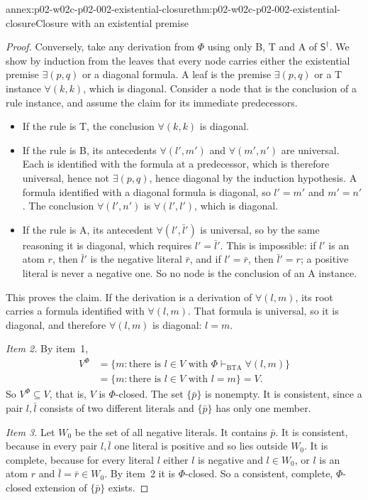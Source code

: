 \begin{annexitem}{annex:p02-w02c-p02-002-existential-closure}{thm:p02-w02c-p02-002-existential-closure}{Closure with an existential premise}
\begin{proof}
Conversely, take any derivation from \(\Phi\) using only B, T and A of
\(\mathsf S^\dagger\). We show by induction from the leaves that every node
carries either the existential premise \(\exists(p,q)\) or a diagonal
formula. A leaf is the premise \(\exists(p,q)\) or a T instance
\(\forall(k,k)\), which is diagonal. Consider a node that is the conclusion
of a rule instance, and assume the claim for its immediate predecessors.
\begin{itemize}
\item If the rule is T, the conclusion \(\forall(k,k)\) is diagonal.
\item If the rule is B, its antecedents \(\forall(l',m')\) and
 \(\forall(m',n')\) are universal. Each is identified with the formula at a
 predecessor, which is therefore universal, hence not \(\exists(p,q)\), hence
 diagonal by the induction hypothesis. A formula identified with a diagonal
 formula is diagonal, so \(l'=m'\) and \(m'=n'\). The conclusion
 \(\forall(l',n')\) is \(\forall(l',l')\), which is diagonal.
\item If the rule is A, its antecedent \(\forall(l',\bar l')\) is universal,
 so by the same reasoning it is diagonal, which requires \(l'=\bar l'\).
 This is impossible: if \(l'\) is an atom \(r\), then \(\bar l'\) is the
 negative literal \(\bar r\), and if \(l'=\bar r\), then \(\bar l'=r\); a
 positive literal is never a negative one. So no node is the conclusion of
 an A instance.
\end{itemize}
This proves the claim. If the derivation is a derivation of
\(\forall(l,m)\), its root carries a formula identified with
\(\forall(l,m)\). That formula is universal, so it is diagonal, and
therefore \(\forall(l,m)\) is diagonal: \(l=m\).

\emph{Item 2.} By item~1,
\begin{align*}
 V^\Phi&=\{m:\text{there is }l\in V\text{ with }
 \Phi\vdash_{\mathrm{BTA}}\forall(l,m)\}\\
 &=\{m:\text{there is }l\in V\text{ with }l=m\}=V.
\end{align*}
So \(V^\Phi\subseteq V\), that is, \(V\) is \(\Phi\)-closed. The set
\(\{\bar p\}\) is nonempty. It is consistent, since a pair \(l,\bar l\)
consists of two different literals and \(\{\bar p\}\) has only one member.

\emph{Item 3.} Let \(W_0\) be the set of all negative literals. It contains
\(\bar p\). It is consistent, because in every pair \(l,\bar l\) one literal
is positive and so lies outside \(W_0\). It is complete, because for every
literal \(l\) either \(l\) is negative and \(l\in W_0\), or \(l\) is an atom
\(r\) and \(\bar l=\bar r\in W_0\). By item~2 it is \(\Phi\)-closed. So a
consistent, complete, \(\Phi\)-closed extension of \(\{\bar p\}\) exists.


\end{proof}
\end{annexitem}
